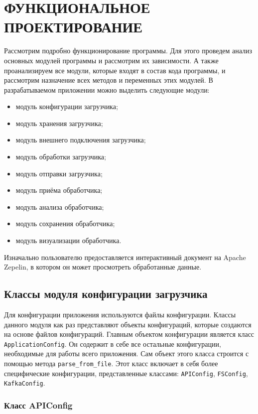 \section{ФУНКЦИОНАЛЬНОЕ ПРОЕКТИРОВАНИЕ}
\label{sec:func}

Рассмотрим подробно функционирование программы.
Для этого проведем анализ основных модулей программы и рассмотрим их зависимости.
А также проанализируем все модули, которые входят в состав кода программы, и рассмотрим назначение всех методов и переменных этих модулей.
В разрабатываемом приложении можно выделить следующие модули:
\begin{itemize}
    \item модуль конфигурации загрузчика;
    \item модуль хранения загрузчика;
    \item модуль внешнего подключения загрузчика;
    \item модуль обработки загрузчика;
    \item модуль отправки загрузчика;
    \item модуль приёма обработчика;
    \item модуль анализа обработчика;
    \item модуль сохранения обработчика;
    \item модуль визуализации обработчика.
\end{itemize}

Изначально пользователю предоставляется интерактивный документ на Apache Zepelin, в котором он может просмотреть обработанные данные.

\subsection{Классы модуля конфигурации загрузчика}
Для конфигурации приложения используются файлы конфигурации.
Классы данного модуля как раз представляют объекты конфигураций, которые создаются на основе файлов конфигураций.
Главным объектом конфигурации является класс \texttt{ApplicationConfig}.
Он содержит в себе все остальные конфигурации, необходимые для работы всего приложения.
Сам объект этого класса строится с помощью метода \texttt{parse\_from\_file}.
Этот класс включает в себя более специфические конфигурации, представленные классами: \texttt{APIConfig}, \texttt{FSConfig}, \texttt{KafkaConfig}.

\subsubsection{Класс APIConfig}

